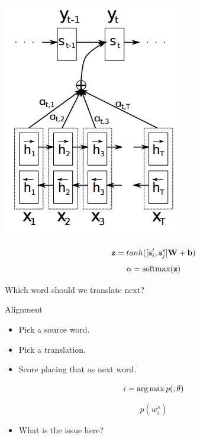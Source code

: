 \documentclass{beamer}
\begin{document}
\begin{frame}
  \begin{center}
    \includegraphics{attenstruct}
  \end{center}
\end{frame}


\begin{frame}
  \[ \mathbf{z} = tanh( [ \mathbf{s}^t_i,  \mathbf{s}^s_j ] \mathbf{W} + \mathbf{b})   \] 
  \[ \mathbf{\alpha} = \softmax(\boldz) \] 
\end{frame}

\begin{frame}

  Which word should we translate next?
\end{frame}


\begin{frame}{Alignment}
  \begin{itemize}
  \item Pick a source word.
  \item Pick a translation.
  \item Score placing that as next word. 
  \end{itemize}
\end{frame}

\begin{frame}
  \[ i = \argmax_{} p( ; \theta) \]
  \[ p( w^s_i) \] 

  \begin{itemize}
  \item What is the issue here?
  \end{itemize}
\end{frame}
\end{document}
